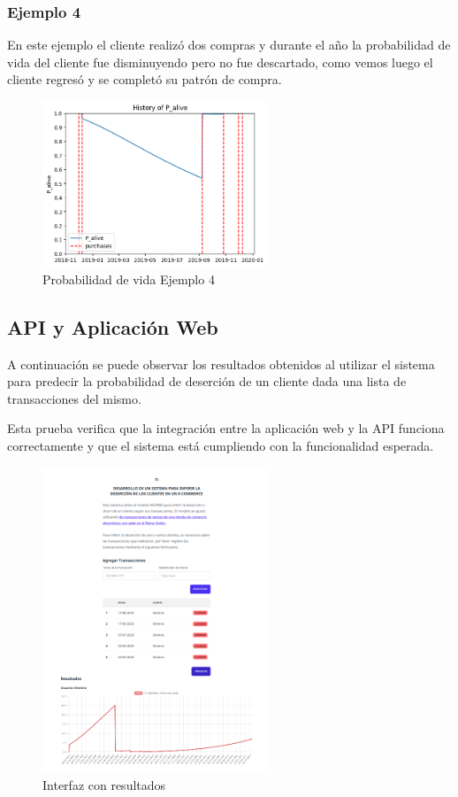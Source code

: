 \subsubsection{Ejemplo 4}

En este ejemplo el cliente realizó dos compras y durante el año la probabilidad de vida del cliente fue disminuyendo pero no fue descartado, como vemos luego el cliente regresó y se completó su patrón de compra.

\begin{figure}[H]
	\centering \includegraphics[width=0.60\textwidth]{images/e4.png}
	\caption{Probabilidad de vida Ejemplo 4}
	\label{fig:e4}
\end{figure}

\subsection{API y Aplicación Web}

A continuación se puede observar los resultados obtenidos al utilizar el sistema para predecir la probabilidad de deserción de un cliente dada una lista de transacciones del mismo.

	Esta prueba verifica que la integración entre la aplicación web y la API funciona correctamente y que el sistema está cumpliendo con la funcionalidad esperada.
	
\begin{figure}[H]
	\centering \includegraphics[width=0.60\textwidth]{images/7.png}
	\caption{Interfaz con resultados}
	\label{fig:ui2}
\end{figure}
